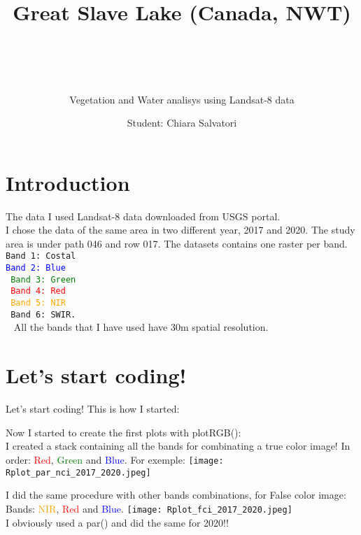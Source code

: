 \documentclass{beamer}
\title{Great Slave Lake (Canada, NWT)
\subtitle{Vegetation and Water analisys using Landsat-8 data}
\\
}
\date{}
\author{\footnotesize{Student: Chiara Salvatori}}
\institute{
 Esame: Telerilevamento Geo-Ecologico.
 
    Professore: Duccio Rocchini
    \\
 \bigskip
 \texttt{[image: great\_slave\_lake\_intro.jpg]}
}
\begin{document}
\maketitle
\section{Introduction}
\begin{frame}{The data}
    I used Landsat-8 data downloaded from USGS portal. \\ I chose the data of the same area in two different year, 2017 and 2020. The study area is under path 046 and row 017. The datasets contains one raster per band. \\ 
    \bigskip
    \texttt{\small{Band 1: Costal\\
    \textcolor{blue}{Band 2: Blue\\}
    \textcolor{green}{Band 3: Green\\}
    \textcolor{red}{Band 4: Red\\}
    \textcolor{orange}{Band 5: NIR\\}
    Band 6: SWIR. \\}
    }
    \bigskip
    All the bands that I have used have 30m spatial resolution.
\end{frame}

\section{Let's start coding!}
\begin{frame}{Let's start coding!}
 This is how I started:
 \bigskip
    \footnotesize{}
    \
\end{frame}

\begin{frame}%
 Now I started to create the first plots with plotRGB():\\
 I created a stack containing all the bands for combinating a true color image! In order: \textcolor{red}{Red}, \textcolor{green}{Green} and \textcolor{blue}{Blue}.
 For exemple: 
    \scriptsize{}
    \texttt{[image: Rplot\_par\_nci\_2017\_2020.jpeg]}\\
\end{frame}

\begin{frame}%
 I did the same procedure with other bands combinations, for False color image:  Bands: \textcolor{orange}{NIR}, \textcolor{red}{Red} and \textcolor{blue}{Blue}.
    \scriptsize{}
    \texttt{[image: Rplot\_fci\_2017\_2020.jpeg]}\\
    I obviously used a par() and did the same for 2020!!
\end{frame}
\end{document}
